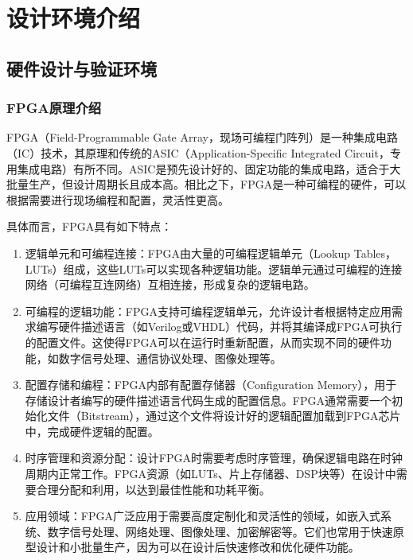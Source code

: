 
\chapter{设计环境介绍}\label{chap:02-design-environment}

\section{硬件设计与验证环境}\label{sec:02-design-environment-001}

\subsection{FPGA原理介绍}\label{sec:02-design-environment-002}

FPGA（Field-Programmable Gate Array，现场可编程门阵列）是一种集成电路（IC）技术，其原理和传统的ASIC（Application-Specific Integrated Circuit，专用集成电路）有所不同。ASIC是预先设计好的、固定功能的集成电路，适合于大批量生产，但设计周期长且成本高。相比之下，FPGA是一种可编程的硬件，可以根据需要进行现场编程和配置，灵活性更高。

具体而言，FPGA具有如下特点：

\begin{enumerate}
\def\labelenumi{\arabic{enumi}.}
\item
  逻辑单元和可编程连接：FPGA由大量的可编程逻辑单元（Lookup Tables，LUTs）组成，这些LUTs可以实现各种逻辑功能。逻辑单元通过可编程的连接网络（可编程互连网络）互相连接，形成复杂的逻辑电路。
\item
  可编程的逻辑功能：FPGA支持可编程逻辑单元，允许设计者根据特定应用需求编写硬件描述语言（如Verilog或VHDL）代码，并将其编译成FPGA可执行的配置文件。这使得FPGA可以在运行时重新配置，从而实现不同的硬件功能，如数字信号处理、通信协议处理、图像处理等。
\item
  配置存储和编程：FPGA内部有配置存储器（Configuration Memory），用于存储设计者编写的硬件描述语言代码生成的配置信息。FPGA通常需要一个初始化文件（Bitstream），通过这个文件将设计好的逻辑配置加载到FPGA芯片中，完成硬件逻辑的配置。
\item
  时序管理和资源分配：设计FPGA时需要考虑时序管理，确保逻辑电路在时钟周期内正常工作。FPGA资源（如LUTs、片上存储器、DSP块等）在设计中需要合理分配和利用，以达到最佳性能和功耗平衡。
\item
  应用领域：FPGA广泛应用于需要高度定制化和灵活性的领域，如嵌入式系统、数字信号处理、网络处理、图像处理、加密解密等。它们也常用于快速原型设计和小批量生产，因为可以在设计后快速修改和优化硬件功能。
\end{enumerate}


